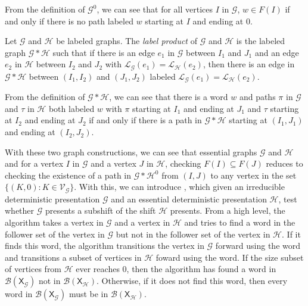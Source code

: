 \documentclass[hidelinks]{report}
\newcommand{\Lc}{\mathcal{L}}  %
\newcommand{\Gc}{\mathcal{G}}  %
\newcommand{\Hc}{\mathcal{H}}  %
\newcommand{\Vc}{\mathcal{V}}
\newcommand{\Bc}{\mathcal{B}}
\newcommand{\shift}[1]{\mathsf{X}_{#1}}
\newcommand{\term}[1]{\textit{#1}}
\theoremstyle{definition}
\begin{document}
From the definition of \(\Gc^0\), we can see that for 
all vertices \(I\) in \(\Gc\), \(w \in F(I)\) if and only if 
there is no path labeled \(w\) starting at \(I\) and ending at \(0\).

\begin{definition}
    Let \(\Gc\) and \(\Hc\) be labeled graphs. The \term{label product} of \(\Gc\) and \(\Hc\)
    is the labeled graph \(\Gc * \Hc\) such that if there is an edge \(e_1\) in \(\Gc\)
    between \(I_1\) and \(J_1\) and an edge \(e_2\) in \(\Hc\) between \(I_2\) and \(J_2\)
    with \(\Lc_\Gc(e_1) = \Lc_\Hc(e_2)\), then there is an edge in \(\Gc * \Hc\) between 
    \((I_1, I_2)\) and \((J_1, J_2)\) labeled \(\Lc_\Gc(e_1) = \Lc_\Hc(e_2)\).
\end{definition}

From the definition of \(\Gc * \Hc\), we can see that there is a word \(w\) and 
paths \(\pi\) in \(\Gc\) and \(\tau\) in \(\Hc\) both labeled \(w\) with
\(\pi\) starting at \(I_1\) and ending at \(J_1\) and \(\tau\) starting at \(I_2\)
and ending at \(J_2\)
if and only if there is a path in \(\Gc*\Hc\) starting at \((I_1, J_1)\) and 
ending at \((I_2, J_2)\).

With these two graph constructions, we can see that essential graphs \(\Gc\) and 
\(\Hc\) and for a vertex 
\(I\) in \(\Gc\) and a vertex \(J\) in \(\Hc\), checking \(F(I) \subseteq F(J)\)
reduces to checking the existence of a path in \(\Gc * \Hc^0\) from \((I, J)\) to 
any vertex in the set \(\{(K, 0) : K \in \Vc_\Gc\}\). With this, we 
can introduce , which given an irreducible deterministic presentation \(\Gc\)
and an essential deterministic presentation \(\Hc\), test whether \(\Gc\)
presents a subshift of the shift \(\Hc\) presents. From a high 
level, the algorithm takes a vertex in \(\Gc\) and a vertex in \(\Hc\) and 
tries to find a word in the follower set of the vertex in \(\Gc\) but 
not in the follower set of the vertex in \(\Hc\). If it finds this word, 
the algorithm transitions the vertex in \(\Gc\) forward using the word and
transitions a subset of vertices in \(\Hc\) foward using the word. If 
the size subset of vertices from \(\Hc\) ever reaches \(0\), then 
the algorithm has found a word in \(\Bc(\shift{\Gc})\) not in \(\Bc(\shift{\Hc})\). 
Otherwise, if it does not find this word, then every word in \(\Bc(\shift{\Gc})\) must be in \(\Bc(\shift{\Hc})\).
\end{document}
